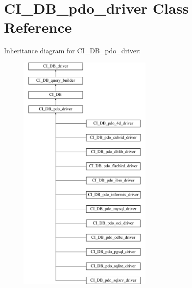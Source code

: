 \hypertarget{class_c_i___d_b__pdo__driver}{}\section{C\+I\+\_\+\+D\+B\+\_\+pdo\+\_\+driver Class Reference}
\label{class_c_i___d_b__pdo__driver}
Inheritance diagram for C\+I\+\_\+\+D\+B\+\_\+pdo\+\_\+driver\+:\begin{figure}[H]
\begin{center}
\leavevmode
\includegraphics[height=12.000000cm]{class_c_i___d_b__pdo__driver}
\end{center}
\end{figure}
